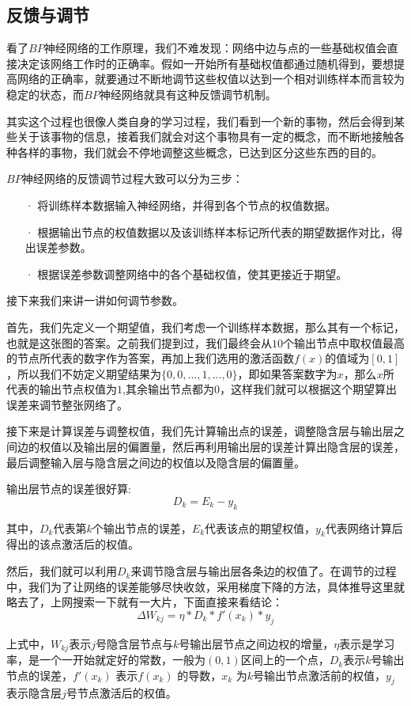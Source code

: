 ﻿\documentclass[UTF8]{ctexart}
\begin{document}
    \subsection{反馈与调节}
看了$BP$神经网络的工作原理，我们不难发现：网络中边与点的一些基础权值会直接决定该网络工作时的正确率。假如一开始所有基础权值都通过随机得到，要想提高网络的正确率，就要通过不断地调节这些权值以达到一个相对训练样本而言较为稳定的状态，而$BP$神经网络就具有这种反馈调节机制。\par
其实这个过程也很像人类自身的学习过程，我们看到一个新的事物，然后会得到某些关于该事物的信息，接着我们就会对这个事物具有一定的概念，而不断地接触各种各样的事物，我们就会不停地调整这些概念，已达到区分这些东西的目的。\par
$BP$神经网络的反馈调节过程大致可以分为三步：
\begin{enumerate}
\item[·]将训练样本数据输入神经网络，并得到各个节点的权值数据。
\item[·]根据输出节点的权值数据以及该训练样本标记所代表的期望数据作对比，得出误差参数。
\item[·]根据误差参数调整网络中的各个基础权值，使其更接近于期望。
\end{enumerate} \par
接下来我们来讲一讲如何调节参数。\par
首先，我们先定义一个期望值，我们考虑一个训练样本数据，那么其有一个标记，也就是这张图的答案。之前我们提到过，我们最终会从$10$个输出节点中取权值最高的节点所代表的数字作为答案，再加上我们选用的激活函数$f(x)$的值域为$[0,1]$，所以我们不妨定义期望结果为$\{0,0,...,1,...,0\}$，即如果答案数字为$x$，那么$x$所代表的输出节点权值为$1$,其余输出节点都为$0$，这样我们就可以根据这个期望算出误差来调节整张网络了。\par
接下来是计算误差与调整权值，我们先计算输出点的误差，调整隐含层与输出层之间边的权值以及输出层的偏置量，然后再利用输出层的误差计算出隐含层的误差，最后调整输入层与隐含层之间边的权值以及隐含层的偏置量。\par
输出层节点的误差很好算:
$$D_k = E_k - y_k$$ \par
其中，$D_k$代表第$k$个输出节点的误差，$E_k$代表该点的期望权值，$y_k$代表网络计算后得出的该点激活后的权值。\par
然后，我们就可以利用$D_k$来调节隐含层与输出层各条边的权值了。在调节的过程中，我们为了让网络的误差能够尽快收敛，采用梯度下降的方法，具体推导这里就略去了，上网搜索一下就有一大片，下面直接来看结论：
$$\Delta W_{kj} = \eta * D_k * f'(x_k) * y_j$$ \par
上式中，$W_{kj}$表示$j$号隐含层节点与$k$号输出层节点之间边权的增量，$\eta$表示是学习率，是一个一开始就定好的常数，一般为$(0,1)$区间上的一个点，$D_k$表示$k$号输出节点的误差，$f'(x_k)$ 表示$f(x_k)$ 的导数，$x_k$ 为$k$号输出节点激活前的权值，$y_j$表示隐含层$j$号节点激活后的权值。\par
\end{document}
